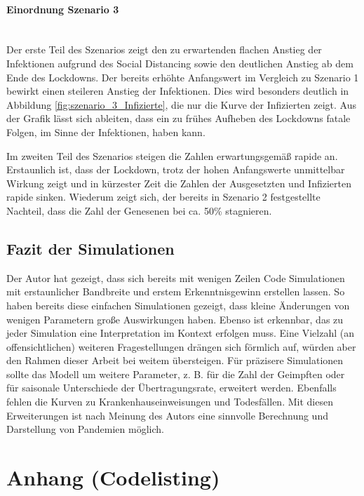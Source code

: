 \documentclass[12pt]{article}
\begin{document}
\paragraph{Einordnung Szenario 3} \mbox{} \\
Der erste Teil des Szenarios zeigt den zu erwartenden flachen Anstieg der Infektionen aufgrund des Social Distancing sowie den deutlichen Anstieg ab dem Ende des Lockdowns. Der bereits erhöhte Anfangswert im Vergleich zu Szenario 1 bewirkt einen steileren Anstieg der Infektionen. Dies wird besonders deutlich in Abbildung \ref{fig:szenario_3_Infizierte}, die nur die Kurve der Infizierten zeigt. Aus der Grafik lässt sich ableiten, dass ein zu frühes Aufheben des Lockdowns fatale Folgen, im Sinne der Infektionen, haben kann.

Im zweiten Teil des Szenarios steigen die Zahlen erwartungsgemäß rapide an. Erstaunlich ist, dass der Lockdown, trotz der hohen Anfangswerte unmittelbar Wirkung zeigt und in kürzester Zeit die Zahlen der Ausgesetzten und Infizierten rapide sinken. Wiederum zeigt sich, der bereits in Szenario 2 festgestellte Nachteil, dass die Zahl der Genesenen bei ca. 50\% stagnieren.

\subsection{Fazit der Simulationen}
Der Autor hat gezeigt, dass sich bereits mit wenigen Zeilen Code Simulationen mit erstaunlicher Bandbreite und erstem Erkenntnisgewinn erstellen lassen. So haben bereits diese einfachen Simulationen gezeigt, dass kleine Änderungen von wenigen Parametern große Auswirkungen haben. Ebenso ist erkennbar, das zu jeder Simulation eine Interpretation im Kontext erfolgen muss. Eine Vielzahl (an offensichtlichen) weiteren Fragestellungen drängen sich förmlich auf, würden aber den Rahmen dieser Arbeit bei weitem übersteigen. Für präzisere Simulationen sollte das Modell um weitere Parameter, z. B. für die Zahl der Geimpften oder für saisonale Unterschiede der Übertragungsrate, erweitert werden. Ebenfalls fehlen die Kurven zu Krankenhauseinweisungen und Todesfällen. Mit diesen Erweiterungen ist nach Meinung des Autors eine sinnvolle Berechnung und Darstellung von Pandemien möglich.

\newpage
\section{Anhang (Codelisting)} \label{sec:Anhang}

\newpage
\printbibliography
\end{document}
